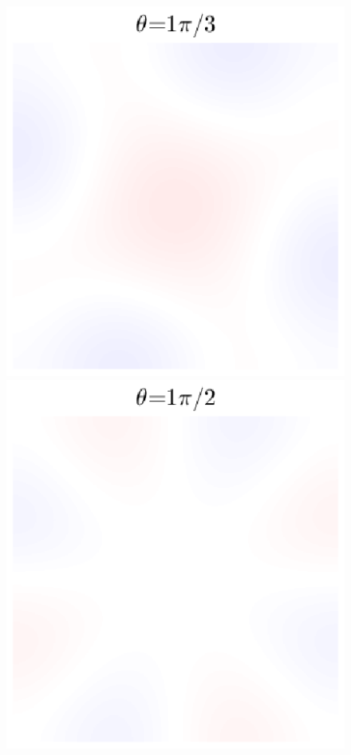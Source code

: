 \begin{figure}
  \includegraphics[trim={0.3in 0.3in 0.3in 0.2in},clip]{../matlab/03_aero_optics_acoustics/tunnel_slices/tunnel_acoustic_against_0.6_8_0_1.0472_081.eps}
  \includegraphics[trim={0.3in 0.3in 0.3in 0.2in},clip]{../matlab/03_aero_optics_acoustics/tunnel_slices/tunnel_acoustic_against_0.6_8_0_1.5708_081.eps}

\end{figure}
